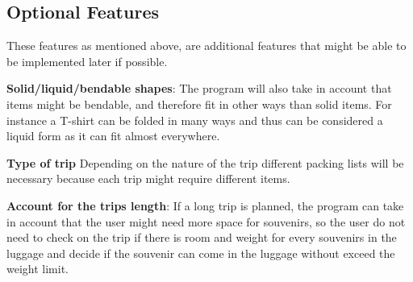 \subsection{Optional Features}
These features as mentioned above, are additional features that might be able to be implemented later if possible.\newline

\textbf{Solid/liquid/bendable shapes}:
The program will also take in account that items might be bendable, and therefore fit in other ways than solid items. For instance a T-shirt can be folded in many ways and thus can be considered a liquid form as it can fit almost everywhere.
\newline

\textbf{Type of trip}
Depending on the nature of the trip different packing lists will be necessary because each trip might require different items.
\newline

\textbf{Account for the trips length}:
If a long trip is planned, the program can take in account that the user might need more space for souvenirs, so the user do not need to check on the trip if there is room and weight for every souvenirs in the luggage and decide if the souvenir can come in the luggage without exceed the weight limit.
\newline
